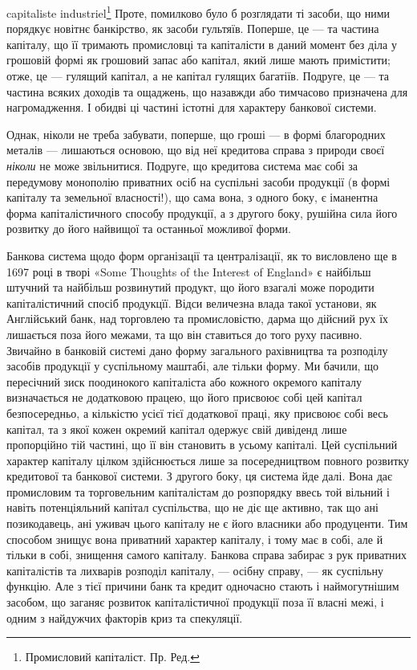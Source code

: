 \parcont{}  %
capitaliste industriel\footnote*{
Промисловий капіталіст. Пр. Ред.
} Проте, помилково було б розглядати ті засоби, що ними
порядкує новітнє банкірство, як засоби гультяїв. Поперше, це — та частина
капіталу, що її тримають промисловці та капіталісти в даний момент без діла
у грошовій формі як грошовий запас або капітал, який лише мають примістити;
отже, це — гулящий капітал, а не капітал гулящих багатіїв. Подруге, це — та
частина всяких доходів та ощаджень, що назавжди або тимчасово призначена
для нагромадження. І обидві ці частині істотні для характеру банкової системи.

Однак, ніколи не треба забувати, поперше, що гроші — в формі благородних
металів — лишаються основою, що від неї кредитова справа з природи
своєї \emph{ніколи} не може звільнитися. Подруге, що кредитова система має собі
за передумову монополію приватних осіб на суспільні засоби продукції (в формі
капіталу та земельної власності!), що сама вона, з одного боку, є іманентна
форма капіталістичного способу продукції, а з другого боку, рушійна сила його
розвитку до його найвищої та останньої можливої форми.

Банкова система щодо форм організації та централізації, як то висловлено
ще в 1697 році в творі «Some Thoughts of the Interest of England» є найбільш
штучний та найбільш розвинутий продукт, що його взагалі може породити
капіталістичний спосіб продукцїї. Відси величезна влада такої установи,
як Англійський банк, над торговлею та промисловістю, дарма що дійсний рух
їх лишається поза його межами, та що він ставиться до того руху пасивно.
Звичайно в банковій системі дано форму загального рахівництва та розподілу
засобів продукції у суспільному маштабі, але тільки форму. Ми бачили, що пересічний
зиск поодинокого капіталіста або кожного окремого капіталу визначається
не додатковою працею, що його присвоює собі цей капітал безпосередньо,
а кількістю усієї тієї додаткової праці, яку присвоює собі весь капітал, та з якої
кожен окремий капітал одержує свій дивіденд лише пропорційно тій частині, що
її він становить в усьому капіталі. Цей суспільний характер капіталу цілком
здійснюється лише за посередництвом повного розвитку кредитової та банкової
системи. З другого боку, ця система йде далі. Вона дає промисловим та торговельним
капіталістам до розпорядку ввесь той вільний і навіть потенціяльний
капітал суспільства, що не діє ще активно, так що ані позикодавець, ані уживач
цього капіталу не є його власники або продуценти. Тим способом знищує
вона приватний характер капіталу, і тому має в собі, але й тільки в собі, знищення
самого капіталу. Банкова справа забирає з рук приватних капіталістів
та лихварів розподіл капіталу, — осібну справу, — як суспільну функцію. Але
з тієї причини банк та кредит одночасно стають і наймогутнішим засобом, що
заганяє розвиток капіталістичної продукції поза її власні межі, і одним з найдужчих
факторів криз та спекуляції.

